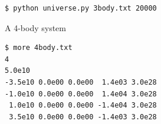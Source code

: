 \documentclass[8pt,a4paper,compress]{beamer}
\begin{document}
\begin{frame}[fragile]
\begin{minipage}{200pt}
\begin{lstlisting}[language={}]
$ python universe.py 3body.txt 20000
\end{lstlisting}
\end{minipage}%
\hfill
\begin{minipage}{100pt}
\begin{center}
\end{center}
\end{minipage}

\pause
\smallskip

\begin{minipage}{200pt}
A 4-body system
\begin{lstlisting}[language={}]
$ more 4body.txt
4 
5.0e10 
-3.5e10 0.0e00 0.0e00  1.4e03 3.0e28 
-1.0e10 0.0e00 0.0e00  1.4e04 3.0e28 
 1.0e10 0.0e00 0.0e00 -1.4e04 3.0e28 
 3.5e10 0.0e00 0.0e00 -1.4e03 3.0e28 
\end{lstlisting}


\end{minipage}
\end{frame}
\end{document}
